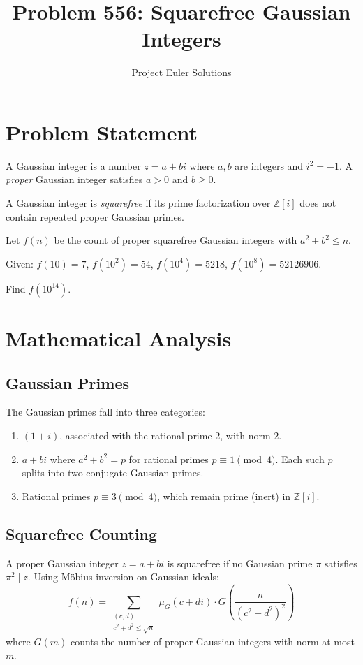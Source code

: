 \documentclass[11pt]{article}
\title{Problem 556: Squarefree Gaussian Integers}
\author{Project Euler Solutions}
\date{}
\begin{document}
\maketitle

\section{Problem Statement}
A Gaussian integer is a number $z = a + bi$ where $a, b$ are integers and $i^2 = -1$. A \emph{proper} Gaussian integer satisfies $a > 0$ and $b \geq 0$.

A Gaussian integer is \emph{squarefree} if its prime factorization over $\mathbb{Z}[i]$ does not contain repeated proper Gaussian primes.

Let $f(n)$ be the count of proper squarefree Gaussian integers with $a^2 + b^2 \leq n$.

Given: $f(10) = 7$, $f(10^2) = 54$, $f(10^4) = 5218$, $f(10^8) = 52126906$.

Find $f(10^{14})$.

\section{Mathematical Analysis}

\subsection{Gaussian Primes}
The Gaussian primes fall into three categories:
\begin{enumerate}
    \item $(1+i)$, associated with the rational prime 2, with norm 2.
    \item $a + bi$ where $a^2 + b^2 = p$ for rational primes $p \equiv 1 \pmod{4}$. Each such $p$ splits into two conjugate Gaussian primes.
    \item Rational primes $p \equiv 3 \pmod{4}$, which remain prime (inert) in $\mathbb{Z}[i]$.
\end{enumerate}

\subsection{Squarefree Counting}
A proper Gaussian integer $z = a + bi$ is squarefree if no Gaussian prime $\pi$ satisfies $\pi^2 \mid z$. Using M\"obius inversion on Gaussian ideals:
\[
f(n) = \sum_{\substack{(c,d) \\ c^2+d^2 \leq \sqrt{n}}} \mu_G(c+di) \cdot G\!\left(\frac{n}{(c^2+d^2)^2}\right)
\]
where $G(m)$ counts the number of proper Gaussian integers with norm at most $m$.
\end{document}
